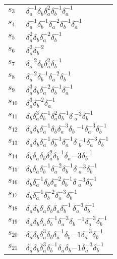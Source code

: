 \documentclass{article}
\begin{document}
\begin{center}
\begin{tabular}{ll}
$s_{3}$ & $\delta_a^{-1}\delta_b^{}\delta_a^{2}\delta_b^{-1}\delta_a^{-1}$ \\
$s_{4}$ & $\delta_a^{-1}\delta_b^{-1}\delta_a^{-2}\delta_b^{-1}\delta_a^{-1}$ \\
$s_{5}$ & $\delta_a^{2}\delta_b^{}\delta_a^{-2}\delta_b^{-1}$ \\
$s_{6}$ & $\delta_a^{2}\delta_b^{-2}$ \\
$s_{7}$ & $\delta_a^{-2}\delta_b^{}\delta_a^{2}\delta_b^{-1}$ \\
$s_{8}$ & $\delta_a^{-2}\delta_b^{-1}\delta_a^{-2}\delta_b^{-1}$ \\
$s_{9}$ & $\delta_a^{3}\delta_b^{}\delta_a^{-2}\delta_b^{-1}\delta_a^{-1}$ \\
$s_{10}$ & $\delta_a^{3}\delta_b^{-2}\delta_a^{-1}$ \\
$s_{11}$ & $\delta_b^{}\delta_a^{3}\delta_b^{-1}\delta_a^{2}\delta_b^{-1}\delta\
_a^{-3}\delta_b^{-1}$ \\
$s_{12}$ & $\delta_a^{}\delta_b^{}\delta_a^{-1}\delta_b^{}\delta_a^{-3}\delta_b\
^{-1}\delta_a^{-3}\delta_b^{-1}$ \\
$s_{13}$ & $\delta_a^{}\delta_b^{}\delta_a^{-1}\delta_b^{-1}\delta_a^{-1}\delta\
_b^{-1}\delta_a^{-3}\delta_b^{-1}$ \\
$s_{14}$ & $\delta_b^{}\delta_a^{}\delta_b^{}\delta_a^{2}\delta_b^{-1}\delta_a^\
{-3}\delta_b^{-1}$ \\
$s_{15}$ & $\delta_b^{}\delta_a^{}\delta_b^{-1}\delta_a^{-2}\delta_b^{-1}\delta\
_a^{-3}\delta_b^{-1}$ \\
$s_{16}$ & $\delta_b^{}\delta_a^{-1}\delta_b^{}\delta_a^{-2}\delta_b^{-1}\delta\
_a^{-3}\delta_b^{-1}$ \\
$s_{17}$ & $\delta_b^{}\delta_a^{-1}\delta_b^{-2}\delta_a^{-3}\delta_b^{-1}$ \\
$s_{18}$ & $\delta_a^{}\delta_b^{}\delta_a^{}\delta_b^{}\delta_a^{}\delta_b^{-1\
}\delta_a^{-3}\delta_b^{-1}$ \\
$s_{19}$ & $\delta_a^{}\delta_b^{}\delta_a^{}\delta_b^{-1}\delta_a^{-3}\delta_b\
^{-1}\delta_a^{-3}\delta_b^{-1}$ \\
$s_{20}$ & $\delta_a^{}\delta_b^{}\delta_a^{3}\delta_b^{}\delta_a^{-1}\delta_b^\
{-1}\delta_a^{-3}\delta_b^{-1}$ \\
$s_{21}$ & $\delta_a^{}\delta_b^{}\delta_a^{3}\delta_b^{-1}\delta_a^{}\delta_b^\
{-1}\delta_a^{-3}\delta_b^{-1}$ \\
\bottomrule
\end{tabular}
\end{center}

\thispagestyle{empty}
\end{document}
